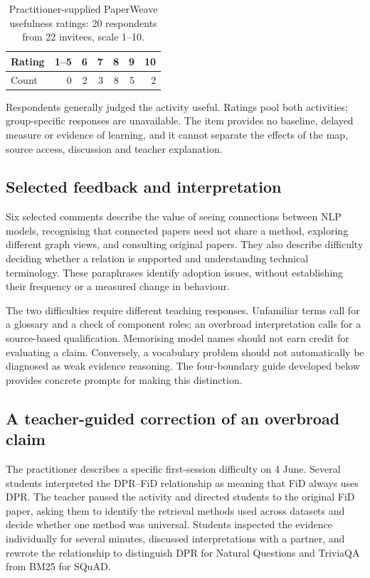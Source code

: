 \begin{table}[ht]
\centering
\caption{Practitioner-supplied PaperWeave usefulness ratings: 20 respondents from 22 invitees, scale 1--10.}
\label{tab:ratings}
\begin{tabular}{lrrrrrr}
\toprule
Rating & 1--5 & 6 & 7 & 8 & 9 & 10\\
\midrule
Count & 0 & 2 & 3 & 8 & 5 & 2\\
\bottomrule
\end{tabular}
\end{table}

Respondents generally judged the activity useful. Ratings pool both activities; group-specific responses are unavailable. The item provides no baseline, delayed measure or evidence of learning, and it cannot separate the effects of the map, source access, discussion and teacher explanation.

\subsection{Selected feedback and interpretation}
Six selected comments describe the value of seeing connections between NLP models, recognising that connected papers need not share a method, exploring different graph views, and consulting original papers. They also describe difficulty deciding whether a relation is supported and understanding technical terminology. These paraphrases identify adoption issues, without establishing their frequency or a measured change in behaviour.

The two difficulties require different teaching responses. Unfamiliar terms call for a glossary and a check of component roles; an overbroad interpretation calls for a source-based qualification. Memorising model names should not earn credit for evaluating a claim. Conversely, a vocabulary problem should not automatically be diagnosed as weak evidence reasoning. The four-boundary guide developed below provides concrete prompts for making this distinction.

\subsection{A teacher-guided correction of an overbroad claim}
The practitioner describes a specific first-session difficulty on 4 June. Several students interpreted the DPR--FiD relationship as meaning that FiD always uses DPR. The teacher paused the activity and directed students to the original FiD paper, asking them to identify the retrieval methods used across datasets and decide whether one method was universal. Students inspected the evidence individually for several minutes, discussed interpretations with a partner, and rewrote the relationship to distinguish DPR for Natural Questions and TriviaQA from BM25 for SQuAD.

